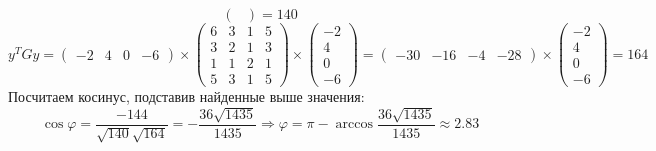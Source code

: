 \documentclass{article}
\begin{document}
\begin{center}
$$\begin{pmatrix}
        \end{pmatrix} = 140$$
    $$y^{T}Gy = \begin{pmatrix}
            -2 & 4 & 0 & -6
        \end{pmatrix}\times\begin{pmatrix}
            6 & 3 & 1 & 5 \\
            3 & 2 & 1 & 3 \\
            1 & 1 & 2 & 1 \\
            5 & 3 & 1 & 5
        \end{pmatrix}\times\begin{pmatrix}
            -2 \\ 4 \\ 0 \\ -6
        \end{pmatrix} = \begin{pmatrix}
            -30 & -16 & -4 & -28
        \end{pmatrix} \times \begin{pmatrix}
            -2 \\ 4 \\ 0 \\ -6
        \end{pmatrix} = 164$$
    Посчитаем косинус, подставив найденные выше значения:
    $$\cos\varphi = \frac{-144}{\sqrt{140}\sqrt{164}} = -\frac{36\sqrt{1435}}{1435} \Rightarrow \varphi = \pi - \arccos\frac{36\sqrt{1435}}{1435} \approx 2.83$$
\end{center}
\end{document}
